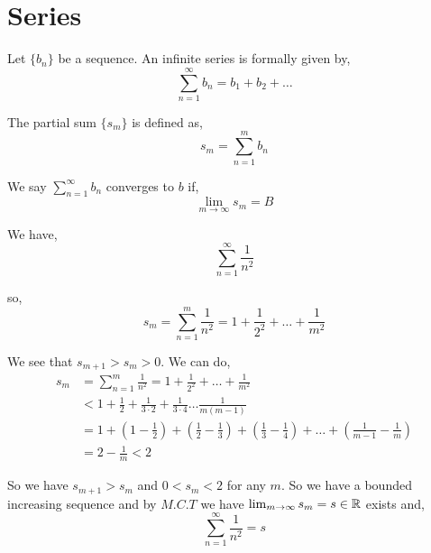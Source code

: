\section{Series}

\begin{definition}
	Let $\{b_n\}$ be a sequence. An infinite series is formally given by,
	$$
	\sum_{n =1}^{\infty}b_n = b_{1} + b_{2} + \dots
	$$
\end{definition}
\begin{definition}
	The partial sum $\{s_m\}$ is defined as,
	$$
	s_m = \sum_{n = 1}^{m} b_n
	$$
\end{definition}

\begin{remark}
	We say $\sum_{n = 1}^{\infty} b_n$ converges to $b$ if, $$
	\lim_{m \to \infty} s_m = B
	$$
\end{remark}
\begin{eg}
	We have, $$
	\sum_{n = 1}^{\infty} \frac{1}{n^2} 
	$$

	so, $$
	s_m = \sum_{n = 1}^{m} \frac{1}{n^2} = 1 + \frac{1}{2^2} + \dots + \frac{1}{m^2}
	$$

	We see that $s_{m + 1} > s_m > 0$.  We can do,
	\begin{align*}
		s_m &= \sum_{n = 1}^{m} \frac{1}{n^2} = 1 + \frac{1}{2^2} + \dots + \frac{1}{m^2}\\
		    &< 1 + \frac{1}{2} + \frac{1}{3 \cdot 2} + \frac{1}{3 \cdot 4} \dots \frac{1}{m(m - 1)}\\
		    &=  1 + \left (1 - \frac{1}{2} \right ) + \left ( \frac{1}{2} - \frac{1}{3} \right ) + \left ( \frac{1}{3} - \frac{1}{4} \right ) + \dots + \left ( \frac{1}{m - 1} - \frac{1}{m} \right )\\
		    &= 2  - \frac{1}{m} < 2
	\end{align*}

	So we have $s_{m + 1} > s_m$  and $0 < s_m < 2 $ for any $m$. So we have a bounded increasing sequence and by $M.C.T$ we have $\lim_{m \to \infty} s_m = s \in \mathbb{R}$ exists and,
	$$
	\sum_{n = 1}^{\infty} \frac{1}{n^2} = s
	$$
\end{eg}										


